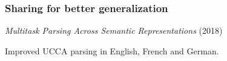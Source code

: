 \documentclass[t,xcolor={svgnames,table}]{beamer}
\begin{document}
\begin{frame}
    \frametitle{Sharing for better generalization}
    
    \textit{Multitask Parsing Across Semantic Representations} (2018)
    
    \vfill
    
    \begin{minipage}{.06\pagewidth}
    \scalebox{8}{\{}
    \end{minipage}
    \begin{minipage}{.27\pagewidth}
    \scalebox{.32}{\exucca}
    \end{minipage}
    \begin{minipage}{.22\pagewidth}
    \scalebox{.5}{\examr}
    \end{minipage}
    \begin{minipage}{.23\pagewidth}
    \scalebox{.5}{\exdm}
    \end{minipage}
    \begin{minipage}{.06\pagewidth}
    \scalebox{8}{\}}
    \end{minipage}
    
    \vfill
    \pause
    
    Improved UCCA parsing in English, French and German.
\end{frame}
\end{document}
